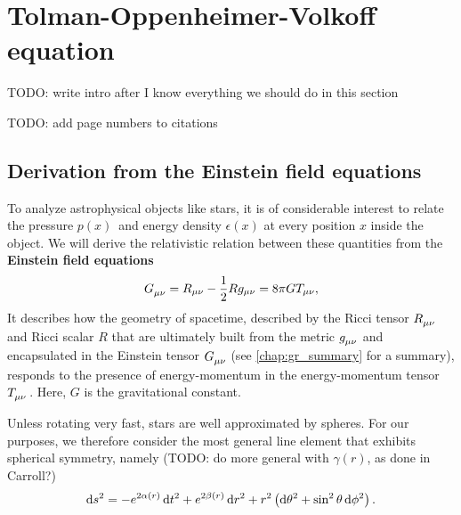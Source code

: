 \chapter{Tolman-Oppenheimer-Volkoff equation}

TODO: write intro after I know everything we should do in this section

TODO: add page numbers to citations

\section{Derivation from the Einstein field equations}
\label{sec:tov}

To analyze astrophysical objects like stars, it is of considerable interest to relate the pressure $p(x)$ and energy density $\epsilon(x)$ at every position $x$ inside the object.
We will derive the relativistic relation between these quantities from the \textbf{Einstein field equations} \cite[equation 4.44]{ref:carroll}
\begin{equation}
	G\indices{_\mu_\nu} = R_{\mu \nu} - \frac{1}{2} R g_{\mu \nu} = 8 \pi G T_{\mu \nu} ,
	\label{eq:einstein}
\end{equation}
It describes how the geometry of spacetime, described by the Ricci tensor $R\indices{_\mu_\nu}$ and Ricci scalar $R$ that are ultimately built from the metric $g\indices{_\mu_\nu}$ and encapsulated in the Einstein tensor $G\indices{_\mu_\nu}$ (see \cref{chap:gr_summary} for a summary), responds to the presence of energy-momentum in the energy-momentum tensor $T\indices{_\mu_\nu}$.
Here, $G$ is the gravitational constant.

Unless rotating very fast, stars are well approximated by spheres.
For our purposes, we therefore consider the most general line element that exhibits spherical symmetry, namely \cite[§ 94-95]{ref:tolman}
(TODO: do more general with $\gamma(r)$, as done in Carroll?)
\begin{equation}
	\mathop{}\!\mathrm{d} s^2 = -e^{2 \alpha(r)} \mathop{}\!\mathrm{d} t^2 + e^{2 \beta(r)} \mathop{}\!\mathrm{d} r^2 + r^2 \left( \mathop{}\!\mathrm{d} \theta^2 + \sin^2 \theta \mathop{}\!\mathrm{d} \phi^2 \right) .
\end{equation}

